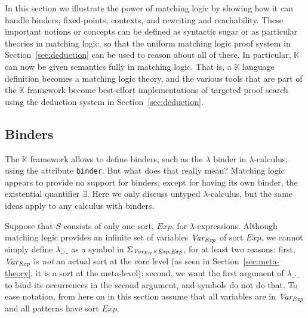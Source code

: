\documentclass[UTF8,11pt]{article}
\theoremstyle{plain}
\theoremstyle{definition}
\theoremstyle{remark}
\newcommand{\K}{\mbox{$\mathbb{K}$}\xspace}
\newcommand{\Exp}{\textit{Exp}}
\begin{document}
In this section we illustrate the power of matching logic by showing how it can
handle binders, fixed-points, contexts, and rewriting and reachability.
These important notions or concepts can be defined as syntactic sugar or as
particular theories in matching logic, so that the uniform matching logic proof
system in Section~\ref{sec:deduction} can be used to reason about all of these.
In particular, \K can now be given semantics fully in matching logic.
That is, a \K language definition becomes a matching logic theory, and the
various tools that are part of the \K framework become best-effort
implementations of targeted proof search using the deduction system in
Section~\ref{sec:deduction}.

\subsection{Binders}
\label{sec:binders}

The \K framework allows to define binders, such as the $\lambda$ binder in
$\lambda$-calculus, using the attribute \texttt{binder}.
But what does that really mean?
Matching logic appears to provide no support for binders, except for having
its own binder, the existential quantifier $\exists$.
Here we only discuss untyped $\lambda$-calculus, but the same ideas apply to
any calculus with binders.

Suppose that $S$ consists of only one sort, $\Exp$, for $\lambda$-expressions.
Although matching logic provides an infinite set of variables $\Var_\Exp$ of
sort $\Exp$, we cannot simply define $\lambda\_.\_$ as a symbol in
$\Sigma_{\Var_\Exp \times \Exp, \Exp}$, for at least two reasons:
first, $\Var_\Exp$ is \emph{not} an actual sort at the core level
(as seen in Section~\ref{sec:meta-theory}, it is a sort at the meta-level);
second, we want the first argument of $\lambda\_.\_$ to bind its occurrences
in the second argument, and symbols do not do that.
To ease notation, from here on in this section assume that all variables
are in $\Var_\Exp$ and all patterns have sort $\Exp$.
\end{document}
